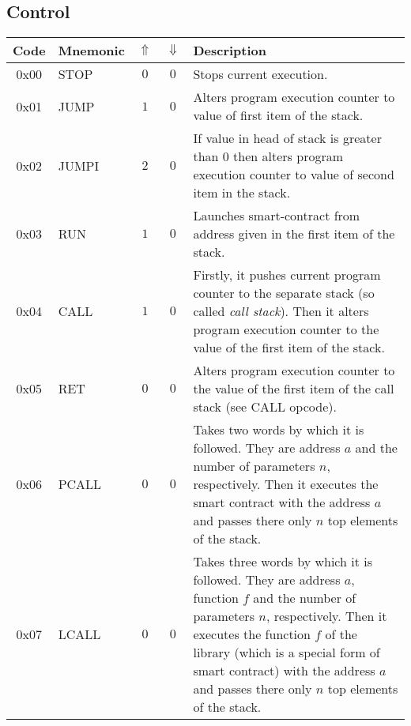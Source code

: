\documentclass[12pt,a4paper]{article}
\begin{document}
\subsection{Control}
\begin{tabularx}{\textwidth}{ c l c c p{7cm} }
\textbf{Code} & \textbf{Mnemonic} & \textbf{$\Uparrow$} & \textbf{$\Downarrow$} & \textbf{Description} \\
\hline
0x00 & STOP & $0$ & $0$ & Stops current execution. \\
\hline
0x01 & JUMP & $1$ & $0$ & Alters program execution counter to value of first item of the stack. \\
\hline
0x02 & JUMPI & $2$ & $0$ & If value in head of stack is greater than 0 then alters program execution counter to value of second item in the stack.  \\
\hline
0x03 & RUN & $1$ & $0$ & Launches smart-contract from address given in the first item of the stack.  \\
\hline
0x04 & CALL & $1$ & $0$ & Firstly, it pushes current program counter to the separate stack (so called \emph{call stack}). Then it alters program execution counter to the value of the first item of the stack.  \\
\hline
0x05 & RET & $0$ & $0$ & Alters program execution counter to the value of the first item of the call stack (see CALL opcode).  \\
\hline
0x06 & PCALL & $0$ & $0$ & Takes two words by which it is followed. They are address $a$ and the number of parameters $n$, respectively. Then it executes the smart contract with the address $a$ and passes there only $n$ top elements of the stack.  \\
\hline
0x07 & LCALL & $0$ & $0$ & Takes three words by which it is followed. They are address $a$, function $f$ and the number of parameters $n$, respectively. Then it executes the function $f$ of the library (which is a special form of smart contract) with the address $a$ and passes there only $n$ top elements of the stack. \\
\hline

\end{tabularx}
\end{document}
